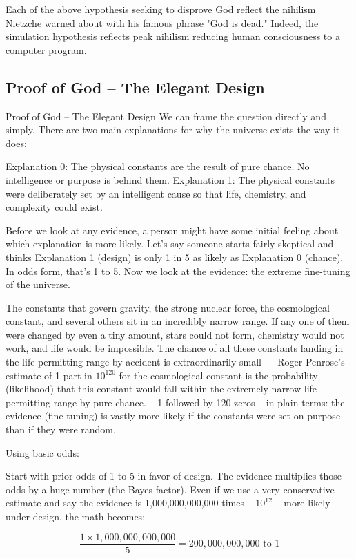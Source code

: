 \documentclass[12pt,a4paper]{book}
\begin{document}
Each of the above hypothesis seeking to disprove God reflect the nihilism Nietzche warned about with his famous phrase "God is dead." Indeed, the simulation hypothesis reflects peak nihilism reducing human consciousness to a computer program.

\subsection{Proof of God -- The Elegant Design}

Proof of God – The Elegant Design
We can frame the question directly and simply.
There are two main explanations for why the universe exists the way it does:

Explanation 0: The physical constants are the result of pure chance. No intelligence or purpose is behind them.
Explanation 1: The physical constants were deliberately set by an intelligent cause so that life, chemistry, and complexity could exist.

Before we look at any evidence, a person might have some initial feeling about which explanation is more likely.  Let’s say someone starts fairly skeptical and thinks Explanation 1 (design) is only 1 in 5 as likely as Explanation 0 (chance). In odds form, that’s 1 to 5.
Now we look at the evidence: the extreme fine-tuning of the universe.

The constants that govern gravity, the strong nuclear force, the cosmological constant, and several others sit in an incredibly narrow range. If any one of them were changed by even a tiny amount, stars could not form, chemistry would not work, and life would be impossible. The chance of all these constants landing in the life-permitting range by accident is extraordinarily small — Roger Penrose’s estimate of 1 part in $10^{120}$ for the cosmological constant is the probability (likelihood) that this constant would fall within the extremely narrow life-permitting range by pure chance. -- 1 followed by 120 zeros --  in plain terms: the evidence (fine-tuning) is vastly more likely if the constants were set on purpose than if they were random.

Using basic odds:

Start with prior odds of 1 to 5 in favor of design.
The evidence multiplies those odds by a huge number (the Bayes factor).  Even if we use a very conservative estimate and say the evidence is 1,000,000,000,000 times -- $10^{12}$ -- more likely under design, the math becomes:

\[ \frac{1 \times 1,000,000,000,000}{5} = 200,000,000,000 \mbox{ to } 1 \]
\end{document}
